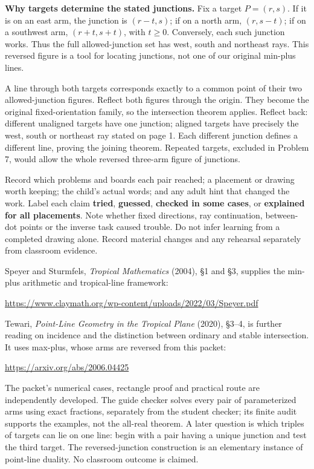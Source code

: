 \documentclass[11pt,letterpaper]{article}
\newcommand{\head}[1]{\par\vspace{4pt}{\large\bfseries #1}\par\vspace{1pt}}
\begin{document}
\textbf{Why targets determine the stated junctions.} Fix a target $P=(r,s)$. If it is on an east arm, the junction is $(r-t,s)$; if on a north arm, $(r,s-t)$; if on a southwest arm, $(r+t,s+t)$, with $t\geq0$. Conversely, each such junction works. Thus the full allowed-junction set has west, south and northeast rays. This reversed figure is a tool for locating junctions, not one of our original min-plus lines.

A line through both targets corresponds exactly to a common point of their two allowed-junction figures. Reflect both figures through the origin. They become the original fixed-orientation family, so the intersection theorem applies. Reflect back: different unaligned targets have one junction; aligned targets have precisely the west, south or northeast ray stated on page 1. Each different junction defines a different line, proving the joining theorem. Repeated targets, excluded in Problem 7, would allow the whole reversed three-arm figure of junctions.

\head{After the session}
Record which problems and boards each pair reached; a placement or drawing worth keeping; the child's actual words; and any adult hint that changed the work. Label each claim \textbf{tried}, \textbf{guessed}, \textbf{checked in some cases}, or \textbf{explained for all placements}. Note whether fixed directions, ray continuation, between-dot points or the inverse task caused trouble. Do not infer learning from a completed drawing alone. Record material changes and any rehearsal separately from classroom evidence.

\head{Source lineage and next questions}
{\fontsize{9.5}{11.6}\selectfont
Speyer and Sturmfels, \emph{Tropical Mathematics} (2004), \S1 and \S3, supplies the min-plus arithmetic and tropical-line framework:\par
\url{https://www.claymath.org/wp-content/uploads/2022/03/Speyer.pdf}\par
Tewari, \emph{Point-Line Geometry in the Tropical Plane} (2020), \S3--4, is further reading on incidence and the distinction between ordinary and stable intersection. It uses max-plus, whose arms are reversed from this packet:\par
\url{https://arxiv.org/abs/2006.04425}\par
The packet's numerical cases, rectangle proof and practical route are independently developed. The guide checker solves every pair of parameterized arms using exact fractions, separately from the student checker; its finite audit supports the examples, not the all-real theorem. A later question is which triples of targets can lie on one line: begin with a pair having a unique junction and test the third target. The reversed-junction construction is an elementary instance of point-line duality. No classroom outcome is claimed.
}
\end{document}
